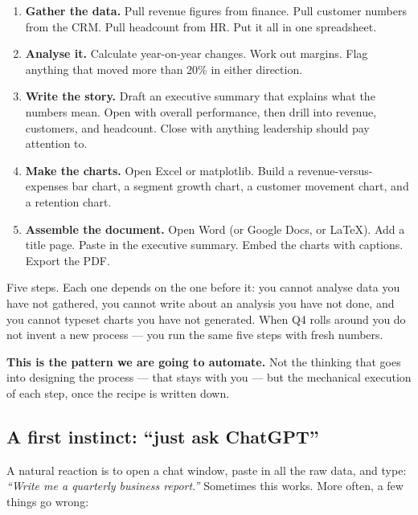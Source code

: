 \documentclass[12pt, a4paper]{article}
\begin{document}
\begin{enumerate}[leftmargin=1.5em]
  \item \textbf{Gather the data.} Pull revenue figures from finance. Pull customer numbers from the CRM. Pull headcount from HR. Put it all in one spreadsheet.
  \item \textbf{Analyse it.} Calculate year-on-year changes. Work out margins. Flag anything that moved more than 20\% in either direction.
  \item \textbf{Write the story.} Draft an executive summary that explains what the numbers mean. Open with overall performance, then drill into revenue, customers, and headcount. Close with anything leadership should pay attention to.
  \item \textbf{Make the charts.} Open Excel or matplotlib. Build a revenue-versus-expenses bar chart, a segment growth chart, a customer movement chart, and a retention chart.
  \item \textbf{Assemble the document.} Open Word (or Google Docs, or \LaTeX). Add a title page. Paste in the executive summary. Embed the charts with captions. Export the PDF.
\end{enumerate}

Five steps. Each one depends on the one before it: you cannot analyse data you have not gathered, you cannot write about an analysis you have not done, and you cannot typeset charts you have not generated. When Q4 rolls around you do not invent a new process --- you run the same five steps with fresh numbers.

\begin{notebox}
\textbf{This is the pattern we are going to automate.} Not the thinking that goes into designing the process --- that stays with you --- but the mechanical execution of each step, once the recipe is written down.
\end{notebox}

\subsection{A first instinct: ``just ask ChatGPT''}

A natural reaction is to open a chat window, paste in all the raw data, and type: \textit{``Write me a quarterly business report.''} Sometimes this works. More often, a few things go wrong:
\end{document}
